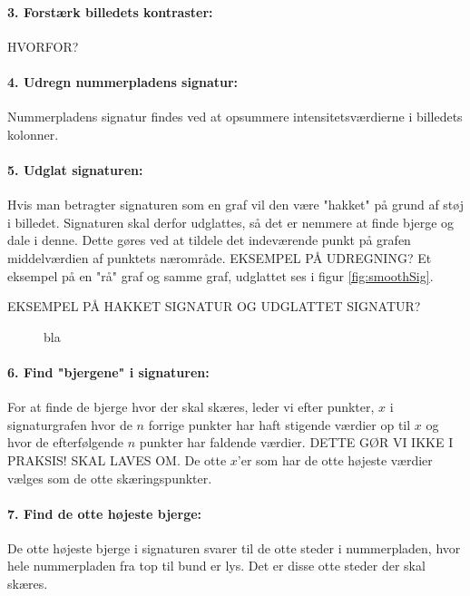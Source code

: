 \paragraph{3. Forstærk billedets kontraster:}
HVORFOR?

\paragraph{4. Udregn nummerpladens signatur:} Nummerpladens signatur findes ved at opsummere intensitetsværdierne i billedets kolonner.

\paragraph{5. Udglat signaturen:} Hvis man betragter signaturen som en graf vil den være "hakket" på grund af støj i billedet. Signaturen skal derfor udglattes, så det er nemmere at finde bjerge og dale i denne. Dette gøres ved at tildele det indeværende punkt på grafen middelværdien af punktets nærområde. EKSEMPEL PÅ UDREGNING? Et eksempel på en "rå" graf og samme graf, udglattet ses i figur \vref{fig:smoothSig}.

EKSEMPEL PÅ HAKKET SIGNATUR OG UDGLATTET SIGNATUR?

\begin{figure}[htp]
\centering
{} 
\caption{bla}
\label{fig:smoothSig}
\end{figure}

\paragraph{6. Find "bjergene" i signaturen:}
For at finde de bjerge hvor der skal skæres, leder vi efter punkter, $x$ i signaturgrafen hvor de $n$ forrige punkter har haft stigende værdier op til $x$ og hvor de efterfølgende $n$ punkter har faldende værdier. DETTE GØR VI IKKE I PRAKSIS! SKAL LAVES OM. De otte $x$'er som har de otte højeste værdier vælges som de otte skæringspunkter.

\paragraph{7. Find de otte højeste bjerge:}
De otte højeste bjerge i signaturen svarer til de otte steder i nummerpladen, hvor hele nummerpladen fra top til bund er lys. Det er disse otte steder der skal skæres.

